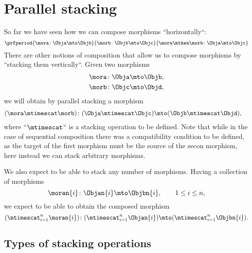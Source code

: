 
\section{Parallel stacking}
\label{sec:parallel-stacking}

So far we have seen how we can compose morphisms ``horizontally``:
%
\begin{equation}
    \prfperiod{
        \mora \colon \Obja \mto \Objb
    }{
        \morb\colon \Objb \mto \Objc
    }{
        \mora \mthen \morb \colon \Obja \mto \Objc
    }
\end{equation}
%
There are other notions of composition that allow us to compose morphisms by ``stacking them vertically``.
Given two morphisms
%
\begin{align}
    \mora & \colon \Obja \mto \Objb, \\
    \morb & \colon \Objc \mto \Objd,
\end{align}
%
we will obtain by parallel stacking a morphism
%
\begin{align}
    (\mora\mtimescat \morb)
     & \colon (\Obja \mtimescat \Objc) \mto (\Objb \mtimescat \Objd),
\end{align}
%
where ``$\mtimescat$`` is a stacking operation to be defined.
Note that while in the case of sequential composition there was a compatibility condition to be defined, as the target of the first morphism must be the source of the secon morphism, here instead we can stack arbitrary morphisms.

We also expect to be able to stack any number of morphisms.
Having a collection of morphisms
%
\begin{equation}
    \moran{i} \colon \Objan{i} \mto \Objbn{i}, \qquad 1 \leq i \leq n,
\end{equation}
%
we expect to be able to obtain the composed morphism
%
\begin{equation}
    (\mtimescat_{i=1}^n  \moran{i} )
    \colon( \mtimescat_{i=1}^n  \Objan{i} )\mto (\mtimescat_{i=1}^n  \Objbn{i}).
\end{equation}

\subsection{Types of stacking operations}


